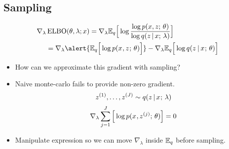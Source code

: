 




\subsection{Sampling}


\begin{frame}
\begin{align*}
    \nabla_\lambda &\ELBO(\theta, \lambda ; x) =  \nabla_\lambda \E_q \Big[\log \frac{\log p(x, z \param \theta)}{\log q (z \given x \param \lambda)} \Big]\\
    &= \nabla_\lambda \alert{\E_{ q}\Big[ \log p(x^{}, z^{} \param \theta) \Big]} -\nabla_\lambda \E_{ q}\Big[ \log q( z^{} \given x^{} \param \theta) \Big]  
\end{align*} 

\begin{itemize}
    \item How can we approximate this gradient with sampling?
    \item Naive monte-carlo fails to provide non-zero gradient.
    \[ z^{(1)}, \dots, z^{(J)} \sim q(z \,|\, x^{} ; \, \lambda) \]
 \[ \nabla_\lambda \sum_{j=1}^J \Big[ \log p(x^{}, z^{(j)} ; \, \theta) \Big] = 0\]
    \item Manipulate expression so we can move $\nabla_\lambda$ inside $\mathbb{E}_q$ before sampling.
\end{itemize}
\end{frame}


